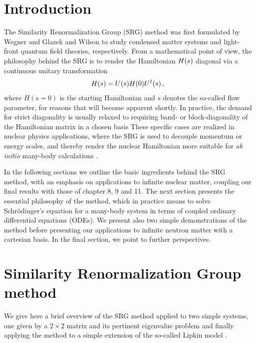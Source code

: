\section{Introduction}

The Similarity Renormalization Group (SRG) method was first formulated by
Wegner \cite{Wegner:1994dk} and Glazek and Wilson \cite{Glazek:1993il}
to study condensed matter systems and light-front quantum field
theories, respectively.  From a mathematical point of view, the
philosophy behind the SRG is to render the Hamiltonian $H(s)$
diagonal via a continuous unitary transformation
\begin{equation}\label{eq:cut}
  \HO(s)=\UO(s)\HO(0)\UUO(s)\,,
\end{equation}
where $H(s=0)$ is the starting Hamiltonian and $s$ denotes the so-called flow
parameter, for reasons that will become apparent shortly. In practice, the demand 
for strict diagonality is usually relaxed to requiring band- or block-diagonality 
of the Hamiltonian matrix in a chosen basis
These specific cases are realized in nuclear
physics applications, where the SRG is used to decouple momentum or
energy scales, and thereby render the nuclear Hamiltonian more
suitable for \emph{ab initio} many-body calculations \cite{bogner2007,bogner2010,morris2015,bogner2016}.

In the following sections we outline the basic ingredients behind the SRG method, with an emphasis on applications to infinite nuclear matter, 
coupling our final results with those of chapter 8, 9 and 11. The next section presents the essential philosophy of the method, which in practice means to solve Schr\"odinger's equation for a many-body system in terms of coupled ordinary differential equations (ODEs). We present also two simple demonstrations
of the method before presenting our applications to infinite neutron matter with a cartesian basis. In the final section, we point to further perspectives.

\section{Similarity Renormalization Group method}

We give here a brief overview of the SRG method applied to two simple systems, one given by a $2\times 2$ matrix and its pertinent eigenvalue problem and finally applying the method to a simple extension of the so-called Lipkin model \cite{lipkin,ellis2007}. 

